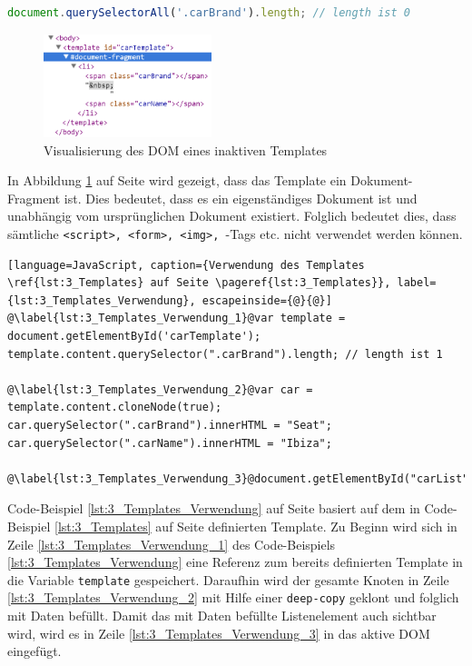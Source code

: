 \begin{lstlisting}[language=JavaScript, caption={Beispiel-Selektor eines Elements in einem Template, das nicht aktiven DOM ist}, label={lst:3_Selector_Example}]
  document.querySelectorAll('.carBrand').length; // length ist 0
\end{lstlisting}

\begin{figure}[h]
\centering
\includegraphics[height=3.0cm]{images/document_fragment.png}
\caption[
Visualisierung des DOM eines inaktiven Templates, Urldate: 04.2014
\newline
\small\texttt{\url{http://www.prevent-default.com/wp-content/uploads/2013/04/document-fragment-300x132.png}}
]{Visualisierung des DOM eines inaktiven Templates}
\label{fig:3_inactive_Template_DOM}
\end{figure}

In Abbildung \ref{fig:3_inactive_Template_DOM} auf Seite \pageref{fig:3_inactive_Template_DOM} wird gezeigt, dass das Template ein Dokument-Fragment ist. Dies bedeutet, dass es ein eigenständiges Dokument ist und unabhängig vom ursprünglichen Dokument existiert. Folglich bedeutet dies, dass sämtliche \lstinline|<script>, <form>, <img>, |-Tags etc. nicht verwendet werden können.

\begin{lstlisting}[language=JavaScript, caption={Verwendung des Templates \ref{lst:3_Templates} auf Seite \pageref{lst:3_Templates}}, label={lst:3_Templates_Verwendung}, escapeinside={@}{@}]
@\label{lst:3_Templates_Verwendung_1}@var template = document.getElementById('carTemplate');
template.content.querySelector(".carBrand").length; // length ist 1

@\label{lst:3_Templates_Verwendung_2}@var car = template.content.cloneNode(true);
car.querySelector(".carBrand").innerHTML = "Seat";
car.querySelector(".carName").innerHTML = "Ibiza";

@\label{lst:3_Templates_Verwendung_3}@document.getElementById("carList").appendChild(car);
\end{lstlisting}
\newpage
Code-Beispiel \ref{lst:3_Templates_Verwendung} auf Seite \pageref{lst:3_Templates_Verwendung} basiert auf dem in Code-Beispiel \ref{lst:3_Templates} auf Seite \pageref{lst:3_Templates} definierten Template. Zu Beginn wird sich in Zeile \ref{lst:3_Templates_Verwendung_1} des Code-Beispiels \ref{lst:3_Templates_Verwendung} eine Referenz zum bereits definierten Template in die Variable \lstinline|template| gespeichert. Daraufhin wird der gesamte Knoten in Zeile \ref{lst:3_Templates_Verwendung_2} mit Hilfe einer \lstinline|deep-copy| geklont und folglich mit Daten befüllt. Damit das mit Daten befüllte Listenelement auch sichtbar wird, wird es in Zeile \ref{lst:3_Templates_Verwendung_3} in das aktive DOM eingefügt.
